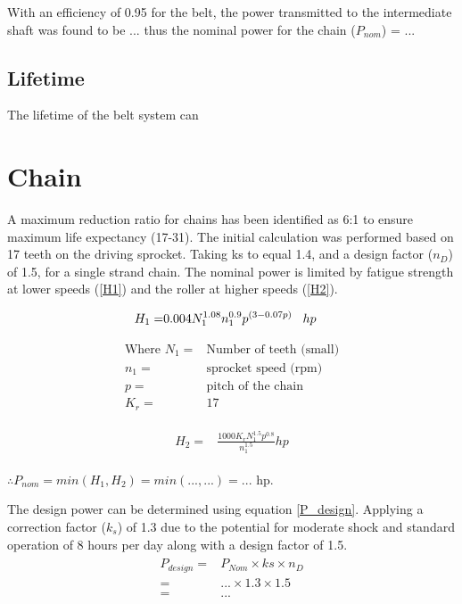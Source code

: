 \documentclass[12pt]{article}
\begin{document}
With an efficiency of 0.95 for the belt, the power transmitted to the intermediate shaft was found to be ... thus the nominal power for the chain ($P_{nom}$) = ... 

\subsection{Lifetime}
The lifetime of the belt system can 

\section{Chain}
A maximum reduction ratio for chains has been identified as 6:1 to ensure maximum life expectancy (17-31). The initial calculation was performed based on 17 teeth on the driving sprocket. Taking ks to equal 1.4, and a design factor ($n_D$) of 1.5, for a single strand chain. The nominal power is limited by fatigue strength at lower speeds (\ref{H1}) and the roller at higher speeds (\ref{H2}).

\begin{align} \label{H1}
    \begin{split}
        H_1 =& 0.004N_1^{1.08}n_1^{0.9}p^{(3-0.07p)} \hspace{0.3cm} hp
    \end{split}
\end{align}

\begin{align*}
        \text{Where } N_1 =& \text{Number of teeth (small)} \\
        n_1 =& \text{sprocket speed (rpm)} \\
        p =& \text{pitch of the chain} \\
        K_r =& 17
\end{align*}

\begin{align} \label{H2}
    \begin{split}
        H_2 =& \frac{1000K_r N_1^{1.5}p^{0.8}}{n_1^{1.5}} hp
    \end{split}
\end{align}

\begin{center}
$\therefore P_{nom} = min(H_1, H_2) = min(...,...) = ... $ hp.\\
\end{center} 

The design power can be determined using equation \ref{P_design}. Applying a correction factor ($k_s$) of 1.3 due to the potential for moderate shock and standard operation of 8 hours per day along with a design factor of 1.5. \\
\begin{align} \label{P_design}
    \begin{split}
        P_{design} =& P_{Nom} \times ks \times n_D \\
        =& ... \times 1.3 \times 1.5 \\
        =& ...
    \end{split}
\end{align}
\end{document}
